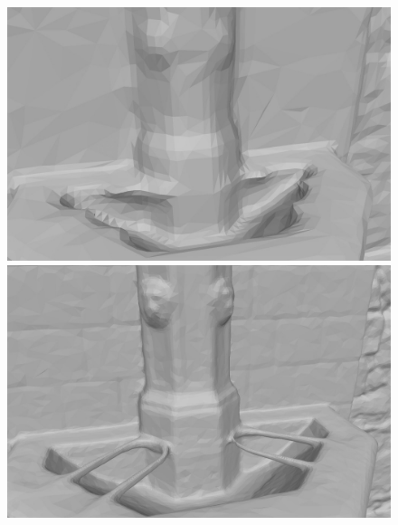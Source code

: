 \documentclass[10pt,twocolumn,letterpaper]{article}
\begin{document}
\begin{figure}
    \centering
    \capstart
    \begin{minipage}[b]{\linewidth}
        \begin{minipage}[b]{0.49\linewidth}
            \includegraphics[width=\textwidth]{images/figures/results/citywall/levels/level11.jpg}
        \end{minipage}
        \begin{minipage}[b]{0.49\linewidth}
            \includegraphics[width=\textwidth]{images/figures/results/citywall/levels/level13.jpg}
        \end{minipage}


\end{minipage}
\end{figure}
\end{document}
